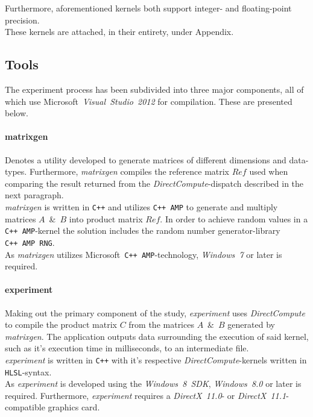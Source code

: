 \documentclass[fleqn,10pt]{SelfArx} %
\begin{document}
\noindent
Furthermore, aforementioned kernels both support integer- and floating-point precision.\\
These kernels are attached, in their entirety, under Appendix.

\subsection{Tools}
\label{sec:contribution:tools}
The experiment process has been subdivided into three major components, all of which use Microsoft~\textit{Visual~Studio~2012} for compilation. These are presented below.

\paragraph{matrixgen}
Denotes a utility developed to generate matrices of different dimensions and data-types. Furthermore, \textit{matrixgen} compiles the reference matrix $Ref$ used when comparing the result returned from the \textit{DirectCompute}-dispatch described in the next paragraph. \\
\textit{matrixgen} is written in \texttt{C++} and utilizes \texttt{C++~AMP} to generate and multiply matrices $A$~\&~$B$ into product matrix $Ref$. In order to achieve random values in a \texttt{C++~AMP}-kernel the solution includes the random number generator-library \texttt{C++~AMP~RNG}.\\
As \textit{matrixgen} utilizes Microsoft~\texttt{C++~AMP}-technology, \textit{Windows~7} or later is required.

\paragraph{experiment}
Making out the primary component of the study, \textit{experiment} uses \textit{DirectCompute} to compile the product matrix $C$ from the matrices $A$~\&~$B$ generated by \textit{matrixgen}. The application outputs data surrounding the execution of said kernel, such as it's execution time in milliseconds, to an intermediate file.\\
\textit{experiment} is written in \texttt{C++} with it's respective \textit{DirectCompute}-kernels written in \texttt{HLSL}-syntax.\\
As \textit{experiment} is developed using the \textit{Windows~8~SDK}, \textit{Windows~8.0} or later is required. Furthermore, \textit{experiment} requires a \textit{DirectX~11.0}- or \textit{DirectX~11.1}-compatible graphics card.
\end{document}
